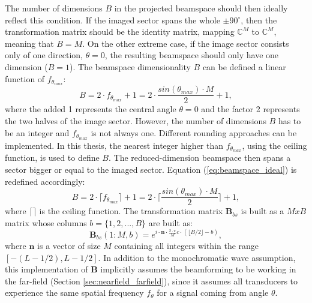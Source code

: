The number of dimensions $B$ in the projected beamspace should then ideally reflect this condition. If the imaged sector spans the whole $\pm 90^{\circ}$, then the transformation matrix should be the identity matrix, mapping $\mathbb{C}^M$ to $\mathbb{C}^M$, meaning that $B = M$. On the other extreme case, if the image sector consists only of one direction, $\theta = 0$, the resulting beamspace should only have one dimension ($B = 1$). The beamspace dimensionality $B$ can be defined a linear function of $f_{\theta_{max}}$:
\begin{equation}
    B = 2 \cdot f_{\theta_{max}} + 1 = 2 \cdot \frac{sin(\theta_{max}) \cdot M}{2} + 1,
\label{eq:beamspace_ideal}
\end{equation}
\noindent
where the added 1 represents the central angle $\theta = 0$ and the factor 2 represents the two halves of the image sector. However, the number of dimensions $B$ has to be an integer and $f_{\theta_{max}}$ is not always one. Different rounding approaches can be implemented. In this thesis, the nearest integer higher than $f_{\theta_{max}}$, using the ceiling function, is used to define $B$. The reduced-dimension beamspace then spans a sector bigger or equal to the imaged sector. Equation (\ref{eq:beamspace_ideal}) is redefined accordingly:
\begin{equation}
    B = 2 \cdot \lceil f_{\theta_{max}} \rceil + 1 = 2 \cdot \lceil \frac{sin(\theta_{max}) \cdot M}{2} \rceil + 1,
\label{eq:beamspace_size}
\end{equation}
\noindent
where $\lceil \rceil$ is the ceiling function.
The transformation matrix $\boldsymbol{B}_{bs}$ is built as a $M x B$ matrix whose columns $b = \{1, 2,..., B \}$ are built as:
\begin{equation}
    \boldsymbol{B}_{bs}(1:M, b) = e^{i \cdot \boldsymbol{n} \cdot \frac{2\cdot \pi}{M} c\cdot (\lfloor B / 2 \rfloor - b)},
\label{eq:beamspace}
\end{equation}
\noindent
where $\boldsymbol{n}$ is a vector of size $M$ containing all integers within the range $[- (L - 1 / 2), L - 1 / 2]$.
In addition to the monochromatic wave assumption, this implementation of $\boldsymbol{B}$ implicitly assumes the beamforming to be working in the far-field (Section \ref{sec:nearfield_farfield}), since it assumes all transducers to experience the same spatial frequency $f_\theta$ for a signal coming from angle $\theta$. 


